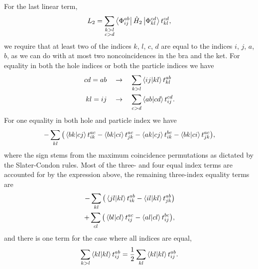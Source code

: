 For the last linear term,
\begin{equation}
    L_2 = \sum_{\substack{k>l \\ c>d}}\bra{\Phi^{ab}_{ij}} \hat{H}_2 \ket{\Phi^{cd}_{kl}} t^{cd}_{kl},
\end{equation}
we require that at least two of the indices $k$, $l$, $c$, $d$ are equal to the indices $i$, $j$, $a$, $b$,
as we can do with at most two noncoincidences in the bra and the ket. For equality in
both the hole indices or both the particle indices we have
\begin{align}
    cd = ab \quad &\to \quad \sum_{k>l}\bra{ij}\ket{kl} t^{ab}_{kl} \\ 
    kl = ij \quad &\to \quad \sum_{c>d}\bra{ab}\ket{cd} t^{cd}_{ij}.
\end{align}
For one equality in both hole and particle index we have
\begin{equation}
    -\sum_{kl}\big(\bra{bk}\ket{cj} t^{ac}_{ik} - \bra{bk}\ket{ci} t^{ac}_{jk}  
                -\bra{ak}\ket{cj} t^{bc}_{ik} - \bra{bk}\ket{ci}  t^{ac}_{jk} \big),
\end{equation}
where the sign stems from the maximum coincidence permutations as dictated by the
Slater-Condon rules. Most of the three- and four equal index terms are accounted
for by the expression above, the remaining three-index equality terms are
\begin{align}
    -\sum_{kl}\big( \bra{jl}\ket{kl} t^{ab}_{ik} - \bra{il}\ket{kl} t^{ab}_{jk} \big) \\
    +\sum_{cl}\big( \bra{bl}\ket{cl} t^{ac}_{ij} - \bra{al}\ket{cl} t^{bc}_{ij} \big),
\end{align}
and there is one term for the case where all indices are equal,
\begin{equation}
    \sum_{k>l} \bra{kl} \ket{kl} t^{ab}_{ij} = \frac{1}{2} \sum_{kl} \bra{kl} \ket{kl} t^{ab}_{ij}.
\end{equation}

